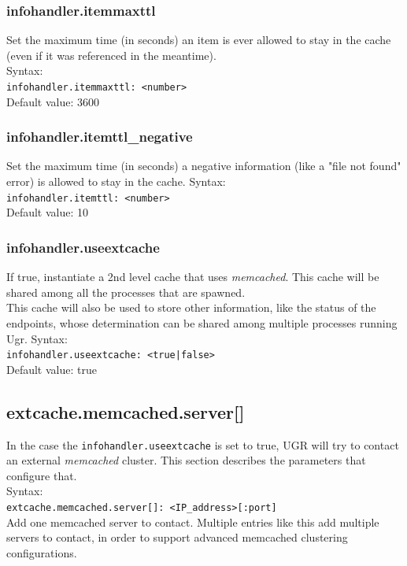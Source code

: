 \documentclass[12pt]{article} %
\begin{document}
\subsubsection{infohandler.itemmaxttl}
Set the maximum time (in seconds) an item is ever allowed to stay in the cache (even if it was referenced in the meantime).\\
Syntax:\\
\lstinline"infohandler.itemmaxttl: <number>"\\
Default value: 3600


\subsubsection{infohandler.itemttl\_negative}
Set the maximum time (in seconds) a negative information (like a "file not found" error) is allowed to stay in the cache.
Syntax:\\
\lstinline"infohandler.itemttl: <number>"\\
Default value: 10


\subsubsection{infohandler.useextcache}
If true, instantiate a 2nd level cache that uses \textit{memcached}. This cache will be shared among all the processes that are spawned.\\
This cache will also be used to store other information, like the status of the endpoints, whose determination can be shared among multiple processes running Ugr.
Syntax:\\
\lstinline"infohandler.useextcache: <true|false>"\\
Default value: true

\subsection{extcache.memcached.server[]}
In the case the \lstinline"infohandler.useextcache" is set to true, UGR will try to contact an external \textit{memcached} cluster.  This section describes the parameters that configure that.\\

 Syntax:\\

\lstinline"extcache.memcached.server[]: <IP_address>[:port]"\\

Add one memcached server to contact. Multiple entries like this add multiple servers to contact, in order to support advanced memcached clustering configurations.\\
\end{document}
